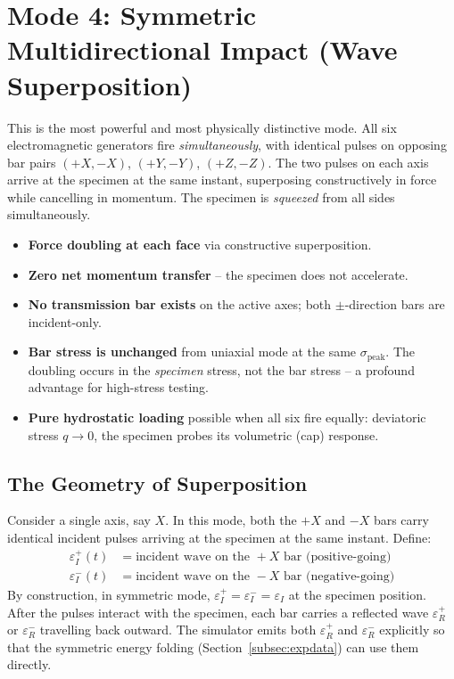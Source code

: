 \documentclass[11pt,a4paper]{article}
\newcommand{\sig}{\sigma}
\newcommand{\eps}{\varepsilon}
\newcommand{\sigpeak}{\sig_{\text{peak}}}
\begin{document}
\newpage
\section{Mode 4: Symmetric Multidirectional Impact (Wave Superposition)}

This is the most powerful and most physically distinctive mode. All six
electromagnetic generators fire \emph{simultaneously}, with identical pulses on
opposing bar pairs $(+X, -X)$, $(+Y, -Y)$, $(+Z, -Z)$. The two pulses on each
axis arrive at the specimen at the same instant, superposing constructively in
force while cancelling in momentum. The specimen is \emph{squeezed} from all
sides simultaneously.

\begin{newfeature}
\begin{itemize}[leftmargin=*, itemsep=2pt]
  \item \textbf{Force doubling at each face} via constructive superposition.
  \item \textbf{Zero net momentum transfer} -- the specimen does not accelerate.
  \item \textbf{No transmission bar exists} on the active axes; both
        $\pm$-direction bars are incident-only.
  \item \textbf{Bar stress is unchanged} from uniaxial mode at the same
        $\sigpeak$. The doubling occurs in the \emph{specimen} stress, not the
        bar stress -- a profound advantage for high-stress testing.
  \item \textbf{Pure hydrostatic loading} possible when all six fire equally:
        deviatoric stress $q \to 0$, the specimen probes its volumetric (cap)
        response.
\end{itemize}
\end{newfeature}

\subsection{The Geometry of Superposition}

Consider a single axis, say $X$. In this mode, both the $+X$ and $-X$ bars carry
identical incident pulses arriving at the specimen at the same instant. Define:
\begin{align}
  \eps_{I}^{+}(t) &= \text{incident wave on the } +X \text{ bar (positive-going)} \\
  \eps_{I}^{-}(t) &= \text{incident wave on the } -X \text{ bar (negative-going)}
\end{align}
By construction, in symmetric mode, $\eps_I^+ = \eps_I^- = \eps_I$ at the
specimen position. After the pulses interact with the specimen, each bar carries
a reflected wave $\eps_R^+$ or $\eps_R^-$ travelling back outward. The simulator
emits both $\eps_R^+$ and $\eps_R^-$ explicitly so that the symmetric energy
folding (Section~\ref{subsec:expdata}) can use them directly.
\end{document}
